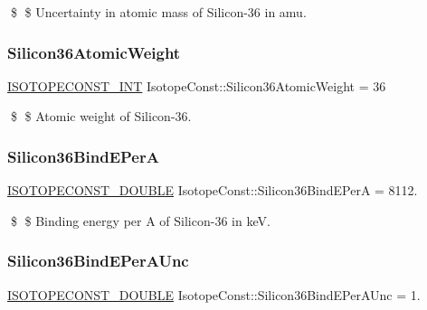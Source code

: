 \$ \$ Uncertainty in atomic mass of Silicon-\/36 in amu. \mbox{\label{group___isotope_const-_silicon-_si36_ga3cccda6c034e8e204d8f4353c03624b5}} 
\subsubsection{\texorpdfstring{Silicon36\+Atomic\+Weight}{Silicon36AtomicWeight}}
{\footnotesize\ttfamily \mbox{\hyperlink{group___isotope_const-_macros_ga5f18360b3e99483a35c32d789e62621c}{I\+S\+O\+T\+O\+P\+E\+C\+O\+N\+S\+T\+\_\+\+I\+NT}} Isotope\+Const\+::\+Silicon36\+Atomic\+Weight = 36}

\$ \$ Atomic weight of Silicon-\/36. \mbox{\label{group___isotope_const-_silicon-_si36_ga2c599b0a977e7fe5542e0bf0f109f7b8}} 
\subsubsection{\texorpdfstring{Silicon36\+Bind\+E\+PerA}{Silicon36BindEPerA}}
{\footnotesize\ttfamily \mbox{\hyperlink{group___isotope_const-_macros_ga8f45a7272ce02c0b4c65c44636ed719a}{I\+S\+O\+T\+O\+P\+E\+C\+O\+N\+S\+T\+\_\+\+D\+O\+U\+B\+LE}} Isotope\+Const\+::\+Silicon36\+Bind\+E\+PerA = 8112.}

\$ \$ Binding energy per A of Silicon-\/36 in keV. \mbox{\label{group___isotope_const-_silicon-_si36_ga3745b9bbfe753357bacce273408d3501}} 
\subsubsection{\texorpdfstring{Silicon36\+Bind\+E\+Per\+A\+Unc}{Silicon36BindEPerAUnc}}
{\footnotesize\ttfamily \mbox{\hyperlink{group___isotope_const-_macros_ga8f45a7272ce02c0b4c65c44636ed719a}{I\+S\+O\+T\+O\+P\+E\+C\+O\+N\+S\+T\+\_\+\+D\+O\+U\+B\+LE}} Isotope\+Const\+::\+Silicon36\+Bind\+E\+Per\+A\+Unc = 1.}

